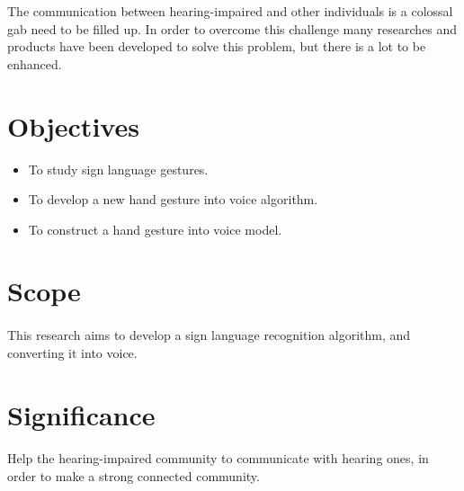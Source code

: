 \documentclass[12pt]{report}
\begin{document}
                The communication between hearing-impaired and other individuals is a colossal gab 
                need to be filled up. In order to overcome this challenge 
                many researches and products have been developed to solve this problem, 
                but there is a lot to be enhanced.
        
        \section{Objectives}
            \begin{itemize}
                \item To study sign language gestures.
                \item To develop a new hand gesture into voice algorithm.
                \item To construct a hand gesture into voice model.
            \end{itemize}
        
        \section{Scope}
            \paragraph{}
                This research aims to develop a sign language recognition algorithm,
                and converting it into voice.
        \section{Significance}
            \paragraph{}
                Help the hearing-impaired community to communicate with hearing ones, 
                in order to make a strong connected community.
\end{document}
